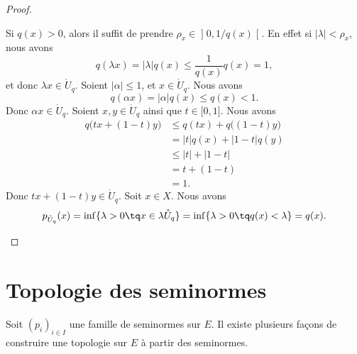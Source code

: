 \begin{proof}
\begin{subproof}
		Si \( q(x)>0\), alors il suffit de prendre \( \rho_x\in \mathopen] 0,1/q(x)\mathclose[\). En effet si \( | \lambda |<\rho_x\), nous avons
		\begin{equation}
			q(\lambda x)=| \lambda |q(x)\leq \frac{1}{ q(x)}q(x)=1,
		\end{equation}
		et donc \( \lambda x\in \mathring{U}_q\).
		Soient \( | \alpha |\leq 1\), et \( x\in \mathring{U}_q\). Nous avons
		\begin{equation}
			q(\alpha x)=| \alpha |q(x)\leq q(x)<1.
		\end{equation}
		Donc \( \alpha x\in \mathring{U}_q\).
		Soient \( x,y\in \mathring{U}_q\) ainsi que \( t\in\mathopen[ 0,1\mathclose]\). Nous avons
		\begin{subequations}
			\begin{align}
				q\big( tx+(1-t)y \big) & \leq q(tx)+q\big( (1-t)y \big) \\
				                       & =| t |q(x)+| 1-t |q(y)         \\
				                       & \leq | t |+| 1-t |             \\
				                       & =t+(1-t)                       \\
				                       & =1.
			\end{align}
		\end{subequations}
		Donc \( tx+(1-t)y\in \mathring{U}_q\).
		\spitem[\( q=p_{\mathring{U}_q}\)]
		Soit \( x\in X\). Nous avons
		\begin{equation}
			p_{\mathring{U}_q}(x)=\inf\{ \lambda>0\tq x\in \lambda \mathring{U}_q \}=\inf\{ \lambda >0\tq q(x)<\lambda \}=q(x).
		\end{equation}
	\end{subproof}
\end{proof}


\section{Topologie des seminormes}

Soit \( (p_i)_{i\in I}\) une famille de seminormes sur \( E\). Il existe plusieurs façons de construire une topologie sur \( E\) à partir des seminormes.


